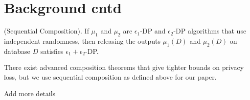 \section{Background cntd}
\begin{theorem}(Sequential Composition). If $\mu_1$ and
$\mu_2$ are $\epsilon_1$-DP and $\epsilon_2$-DP algorithms that use independent randomness, then releasing the outputs $\mu_1(D)$ and
$\mu_2(D)$ on database $D$ satisfies $\epsilon_1+\epsilon_2$-DP.\end{theorem} There exist advanced composition theorems that give tighter
bounds on privacy loss, but we
use sequential composition as defined above for our paper.

Add more details
